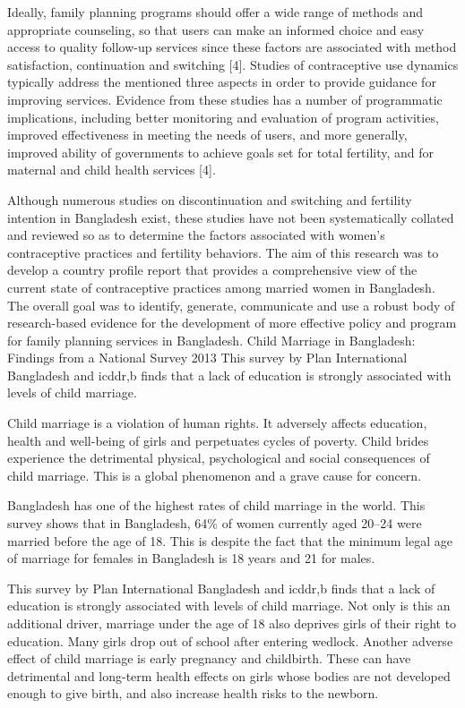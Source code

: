 \documentclass[a4paper,12pt]{article}
\begin{document}
Ideally, family planning programs should offer a wide range of methods and appropriate counseling, so that users can make an informed choice and easy access to quality follow-up services since these factors are associated with method satisfaction, continuation and switching [4]. Studies of contraceptive use dynamics typically address the mentioned three aspects in order to provide guidance for improving services. Evidence from these studies has a number of programmatic implications, including better monitoring and evaluation of program activities, improved effectiveness in meeting the needs of users, and more generally, improved ability of governments to achieve goals set for total fertility, and for maternal and child health services [4].

Although numerous studies on discontinuation and switching and fertility intention in Bangladesh exist, these studies have not been systematically collated and reviewed so as to determine the factors associated with women’s contraceptive practices and fertility behaviors. The aim of this research was to develop a country profile report that provides a comprehensive view of the current state of contraceptive practices among married women in Bangladesh. The overall goal was to identify, generate, communicate and use a robust body of research-based evidence for the development of more effective policy and program for family planning services in Bangladesh.
Child Marriage in Bangladesh: Findings from a National Survey 2013
This survey by Plan International Bangladesh and icddr,b finds that a lack of education is strongly associated with levels of child marriage.

Child marriage is a violation of human rights. It adversely affects education, health and well-being of girls and perpetuates cycles of poverty. Child brides experience the detrimental physical, psychological and social consequences of child marriage. This is a global phenomenon and a grave cause for concern.

Bangladesh has one of the highest rates of child marriage in the world. This survey shows that in Bangladesh, 64\% of women currently aged 20–24 were married before the age of 18. This is despite the fact that the minimum legal age of marriage for females in Bangladesh is 18 years and 21 for males.

This survey by Plan International Bangladesh and icddr,b finds that a lack of education is strongly associated with levels of child marriage. Not only is this an additional driver, marriage under the age of 18 also deprives girls of their right to education. Many girls drop out of school after entering wedlock. Another adverse effect of child marriage is early pregnancy and childbirth. These can have detrimental and long-term health effects on girls whose bodies are not developed enough to give birth, and also increase health risks to the newborn.
\end{document}
